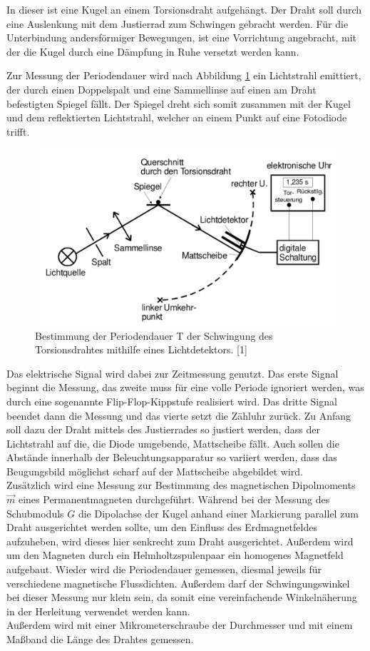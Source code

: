 In dieser ist eine Kugel an einem Torsionsdraht aufgehängt. Der Draht soll durch eine Auslenkung
mit dem Justierrad zum Schwingen gebracht werden. Für die Unterbindung andersförmiger Bewegungen, 
ist eine Vorrichtung angebracht, mit der die Kugel durch eine Dämpfung in Ruhe versetzt werden 
kann.

Zur Messung der Periodendauer wird nach Abbildung \ref{fig:Licht} ein Lichtstrahl emittiert, 
der durch einen Doppelspalt und eine Sammellinse auf einen am Draht befestigten Spiegel fällt. 
Der Spiegel dreht sich somit zusammen mit der Kugel und dem reflektierten Lichtstrahl, 
welcher an einem Punkt auf eine Fotodiode trifft.

\begin{figure}
  \centering
  \includegraphics[scale=0.2]{content/Licht.png}
  \caption{Bestimmung der Periodendauer T der Schwingung des Torsionsdrahtes mithilfe eines Lichtdetektors. [1]}
  \label{fig:Licht}
\end{figure}

Das elektrische Signal wird dabei zur Zeitmessung genutzt. Das erste Signal beginnt die Messung,
das zweite muss für eine volle Periode ignoriert werden, was durch eine sogenannte Flip-Flop-Kippstufe realisiert wird.
Das dritte Signal beendet dann die Messung und das vierte setzt die Zähluhr zurück. 
Zu Anfang soll dazu der Draht mittels des Justierrades so justiert werden, dass der Lichtstrahl
auf die, die Diode umgebende, Mattscheibe fällt. Auch sollen die Abstände innerhalb der Beleuchtungsapparatur 
so variiert werden, dass das Beugungsbild möglichst scharf auf der Mattscheibe abgebildet wird.\\

Zusätzlich wird eine Messung zur Bestimmung des magnetischen Dipolmoments $\vec{m}$ eines Permanentmagneten
durchgeführt. Während bei der Messung des Schubmoduls $G$ die Dipolachse der Kugel anhand einer Markierung
parallel zum Draht ausgerichtet werden sollte, um den Einfluss des Erdmagnetfeldes aufzuheben, wird
dieses hier senkrecht zum Draht ausgerichtet. Außerdem wird um den Magneten durch ein Helmholtzspulenpaar
ein homogenes Magnetfeld aufgebaut. Wieder wird die Periodendauer gemessen, diesmal jeweils für verschiedene
magnetische Flussdichten. Außerdem darf der Schwingungswinkel bei dieser Messung nur klein sein, da somit eine 
vereinfachende Winkelnäherung in der Herleitung verwendet werden kann.\\

Außerdem wird mit einer Mikrometerschraube der Durchmesser und mit einem Maßband die Länge 
des Drahtes gemessen. 

